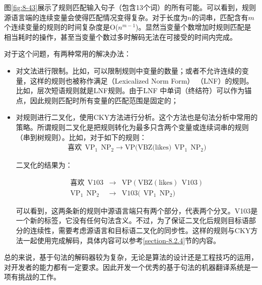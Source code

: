 \parinterval 图\ref{fig:8-43}展示了规则匹配输入句子（包含13个词）的所有可能。可以看到，规则源语言端的连续变量会使得匹配情况变得复杂。对于长度为$n$的词串，匹配含有$m$个连续变量的规则的时间复杂度是O($n^{m-1}$)。显然当变量个数增加时规则匹配是相当耗时的操作，甚至当变量个数过多时解码无法在可接受的时间内完成。

\parinterval 对于这个问题，有两种常用的解决办法：
\begin{itemize}
\vspace{0.5em}
\item 对文法进行限制。比如，可以限制规则中变量的数量；或者不允许连续的变量，这样的规则也被称作满足{\small{}}（Lexicalized Norm Form） （LNF）的规则。比如，层次短语规则就是LNF规则。由于LNF 中单词（终结符）可以作为锚点，因此规则匹配时所有变量的匹配范围是固定的；
\vspace{0.5em}
\item 对规则进行二叉化，使用CKY方法进行分析。这个方法也是句法分析中常用的策略。所谓规则二叉化是把规则转化为最多只含两个变量或连续词串的规则（串到树规则）。比如，对于如下的规则：
\begin{eqnarray}
\textrm{喜欢}\ \ \textrm{VP}_1\ \ \textrm{NP}_2 \rightarrow \textrm{VP(VBZ(likes)}\ \ \textrm{VP}_1\ \ \textrm{NP}_2 ) \nonumber
\end{eqnarray}

\noindent 二叉化的结果为：

\begin{eqnarray}
\textrm{喜欢}\ \ \textrm{V103} &\rightarrow& \textrm{VP}(\textrm{VBZ}(\textrm{likes})\ \ \textrm{V103} ) \nonumber \\
\textrm{VP}_1\ \ \textrm{NP}_2 &\rightarrow& \textrm{V103(}\ \ \textrm{VP}_1\ \ \textrm{NP}_2 ) \nonumber
\end{eqnarray}

\noindent 可以看到，这两条新的规则中源语言端只有两个部分，代表两个分叉。V103是一个新的标签，它没有任何句法含义。不过，为了保证二叉化后规则目标语部分的连续性，需要考虑源语言和目标语二叉化的同步性。这样的规则与CKY方法一起使用完成解码，具体内容可以参考\ref{section-8.2.4}节的内容。
\vspace{0.5em}
\end{itemize}

\parinterval 总的来说，基于句法的解码器较为复杂，无论是算法的设计还是工程技巧的运用，对开发者的能力都有一定要求。因此开发一个优秀的基于句法的机器翻译系统是一项有挑战的工作。

